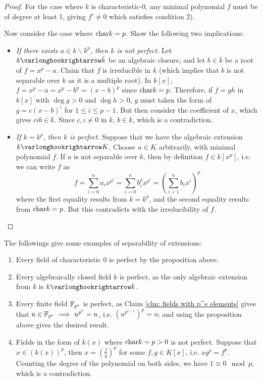 \begin{proof}
    For the case where $k$ is characteristic-0, any minimal polynomial $f$ must be of degree at least 1, giving $f' \neq 0$ which satisfies condition 2).

    Now consider the case where $\mathrm{char}{k} = p$. Show the following two implications:
    \begin{itemize}
        \item \emph{If there exists $a \in k \smallsetminus k^p$, then $k$ is not perfect.} Let $k \ext \bar{k}$ be an algebraic closure, and let $b \in \bar{k}$ be a root of $f = x^p - a$. Claim that $f$ is irreducible in $k$ (which implies that $b$ is not separable over $k$ as it is a multiple root). In $k[x]$, $f = x^p - a = x^p - b^p = (x - b)^p$ since $\mathrm{char}{k} = p$. Therefore, if $f = gh$ in $k[x]$ with $\deg g > 0$ and $\deg h > 0$, $g$ must taken the form of $g = c(x - b)^i$ for $1 \leq i \leq p - 1$. But then consider the coefficient of $x$, which gives $cib \in k$. Since $c, i \neq 0$ in $k$, $b \in k$, which is a contradiction.
        \item \emph{If $k = k^p$, then $k$ is perfect.} Suppose that we have the algebraic extension $k \ext K$. Choose $u \in K$ arbitrarily, with minimal polynomial $f$. If $u$ is not separable over $k$, then by definition $f \in k[x^p]$, i.e. we can write $f$ as
        \[
            f = \sum_{i = 0}^n a_i x^{p^i} = \sum_{i = 0}^n b_i^p x^{p^i} = \left( \sum_{i = 1}^n b_i x^i \right)^p
        \]
        where the first equality results from $k = k^p$, and the second equality results from $\mathrm{char}{k} = p$. But this contradicts with the irreducibility of $f$.
    \end{itemize}
\end{proof}

\begin{example}
    The followings give some examples of separability of extensions:
    \begin{enumerate}
        \item Every field of characteristic 0 is perfect by the proposition above.
        \item Every algebraically closed field $k$ is perfect, as the only algebraic extension from $k$ is $k \ext k$.
        \item Every finite field $\mathbb{F}_{p^e}$ is perfect, as Claim \ref{clm: fields with p^e elements} gives that $u \in \mathbb{F}_{p^e} \ \Longrightarrow\  u^{p^e} = u$, i.e. $\left(u^{p^{e-1}}\right)^p = u$; and using the proposition above gives the desired result.
        \item Fields in the form of $k(x)$ where $\mathrm{char}{k} = p > 0$ is not perfect. Suppose that $x \in \left( k(x) \right)^p$, then $x = \left( \frac{f}{g} \right)^p$ for some $f, g \in K[x]$, i.e. $x g^p = f^p$. Counting the degree of the polynomial on both sides, we have $1 \equiv 0 \mod{p}$, which is a contradiction.
    \end{enumerate}
\end{example}

